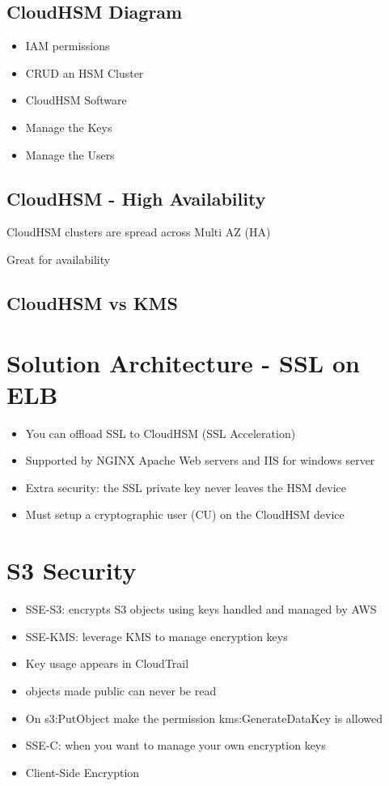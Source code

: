 \subsection{CloudHSM Diagram}
\begin{itemize}
    \item IAM permissions
    \item CRUD an HSM Cluster
    \item CloudHSM Software
    \item Manage the Keys
    \item Manage the Users
\end{itemize}

\subsection{CloudHSM - High Availability}
\item CloudHSM clusters are spread across Multi AZ (HA)
\item Great for availability


\subsection{CloudHSM vs KMS}


\section{Solution Architecture - SSL on ELB}


\begin{itemize}
    \item You can offload SSL to CloudHSM (SSL Acceleration)
    \item Supported by NGINX Apache Web servers and IIS for windows server
    \item Extra security: the SSL private key never leaves the HSM device
    \item Must setup a cryptographic user (CU) on the CloudHSM device
\end{itemize}



\section{S3 Security}
\begin{itemize}
    \item SSE-S3: encrypts S3 objects using keys handled and managed by AWS
    \item SSE-KMS: leverage KMS to manage encryption keys
    \item Key usage appears in CloudTrail
    \item objects made public can never be read
    \item On s3:PutObject make the permission kms:GenerateDataKey is allowed
    \item SSE-C: when you want to manage your own encryption keys
    \item Client-Side Encryption
\end{itemize}

